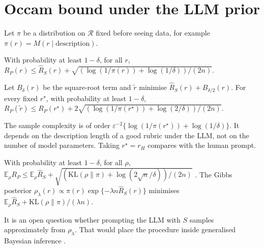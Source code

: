 \section{Occam bound under the LLM prior}\label{sec:occam}

Let $\pi$ be a distribution on $\mathcal R$ fixed before seeing data, for example $\pi(r)=M(r\mid\text{description})$.

\begin{proposition}\label{prop:occam}
With probability at least $1-\delta$, for all $r$, $R_P(r)\le\hat R_S(r)+\sqrt{(\log(1/\pi(r))+\log(1/\delta))/(2n)}$.
\end{proposition}

\begin{corollary}\label{cor:oracle}
Let $B_\delta(r)$ be the square-root term and $\tilde r$ minimise $\hat R_S(r)+B_{\delta/2}(r)$.
For every fixed $r^\star$, with probability at least $1-\delta$, $R_P(\tilde r)\le R_P(r^\star)+2\sqrt{(\log(1/\pi(r^\star))+\log(2/\delta))/(2n)}$.
\end{corollary}

The sample complexity is of order $\varepsilon^{-2}\{\log(1/\pi(r^\star))+\log(1/\delta)\}$.
It depends on the description length of a good rubric under the LLM, not on the number of model parameters.
Taking $r^\star=r_H$ compares with the human prompt.

\begin{proposition}\label{prop:pac-bayes}
With probability at least $1-\delta$, for all $\rho$, $\mathbb E_\rho R_P\le\mathbb E_\rho\hat R_S+\sqrt{(\mathrm{KL}(\rho\|\pi)+\log(2\sqrt n/\delta))/(2n)}$ \citep{maurer2004note}.
The Gibbs posterior $\rho_\lambda(r)\propto\pi(r)\exp\{-\lambda n\hat R_S(r)\}$ minimises $\mathbb E_\rho\hat R_S+\mathrm{KL}(\rho\|\pi)/(\lambda n)$.
\end{proposition}

It is an open question whether prompting the LLM with $S$ samples approximately from $\rho_\lambda$.
That would place the procedure inside generalised Bayesian inference \citep{bissiri2016general}.

